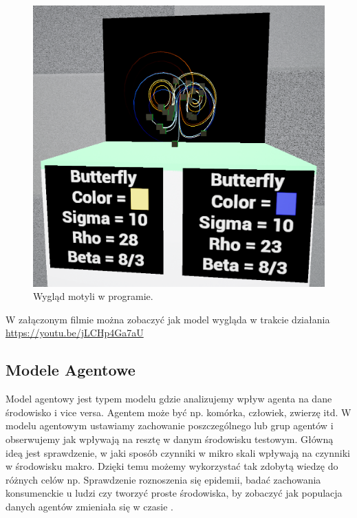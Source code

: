 \documentclass[a4paper,12pt,reqno]{article}
\begin{document}
\begin{figure}[H]%
\centering
\includegraphics[width=0.9\columnwidth]{graphics/butterfly/ButterflyInUE_1.png}
\caption{Wygląd motyli w programie.
\label{ButterflyEffectUE4}}%
%
\qquad
\end{figure}  

W załączonym filmie można zobaczyć jak model wygląda w trakcie działania \url{https://youtu.be/jLCHp4Ga7aU}

\newpage
\subsection{Modele Agentowe}

Model agentowy jest typem modelu gdzie analizujemy wpływ agenta na dane środowisko i vice versa. Agentem może być np. komórka, człowiek, zwierzę itd. W modelu agentowym ustawiamy zachowanie poszczególnego lub grup agentów i obserwujemy jak wpływają na resztę w danym środowisku testowym. Główną ideą jest sprawdzenie, w jaki sposób czynniki w mikro skali wpływają na czynniki w środowisku makro. Dzięki temu możemy wykorzystać tak zdobytą wiedzę do różnych celów np. Sprawdzenie roznoszenia się epidemii, badać zachowania konsumenckie u ludzi czy tworzyć proste środowiska, by zobaczyć jak populacja danych agentów zmieniała się w czasie \cite{agent_examples}.
\end{document}
